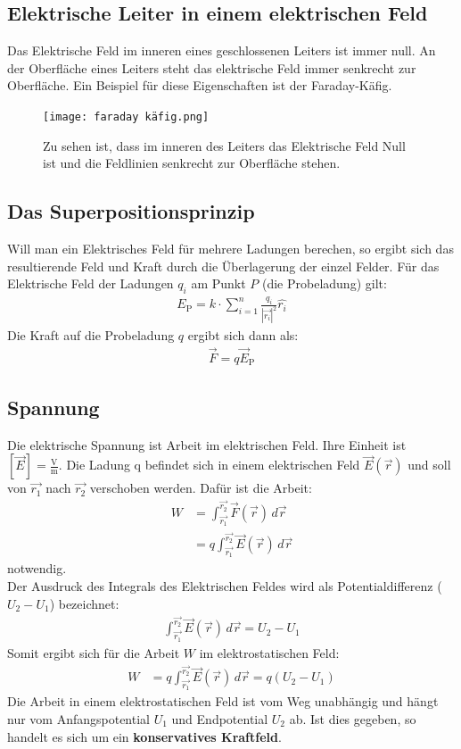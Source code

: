 \documentclass{article}
\begin{document}
\subsection{Elektrische Leiter in einem elektrischen Feld}
Das Elektrische Feld im inneren eines geschlossenen Leiters ist immer null.
An der Oberfläche eines Leiters steht das elektrische Feld immer senkrecht zur Oberfläche.
Ein Beispiel für diese Eigenschaften ist der Faraday-Käfig.
\begin{figure}[H]
    \centering 
    \texttt{[image: faraday käfig.png]}
    \caption{Zu sehen ist, dass im inneren des Leiters das Elektrische Feld Null ist und die Feldlinien senkrecht zur Oberfläche stehen.}
\end{figure}

\subsection{Das Superpositionsprinzip}
Will man ein Elektrisches Feld für mehrere Ladungen berechen, so ergibt sich das resultierende Feld und Kraft 
durch die Überlagerung der einzel Felder.
Für das Elektrische Feld der Ladungen $q_i$ am Punkt $P$ (die Probeladung) gilt:
\begin{align}
    E_\mathrm{P}=k\cdot \sum_{i=1}^n \frac{q_i}{|\vec{r_i}|^2}\hat{r_i}
\end{align}
Die Kraft auf die Probeladung $q$ ergibt sich dann als:
\begin{align}
    \vec{F}=q\vec{E}_\mathrm{P}
\end{align}


\subsection{Spannung}
Die elektrische Spannung ist Arbeit im elektrischen Feld. Ihre Einheit ist $[\vec{E}]=\frac{\mathrm{V}}{\mathrm{m}}$.
Die Ladung q befindet sich in einem elektrischen Feld $\vec{E}(\vec{r})$ und soll von $\vec{r_1}$ nach $\vec{r_2}$ verschoben
werden. Dafür ist die Arbeit:
\begin{align}
    W&=\int_{\vec{r_1}}^{\vec{r_2}}\vec{F}(\vec{r})\,d\vec{r}\\
    &=q\int_{\vec{r_1}}^{\vec{r_2}}\vec{E}(\vec{r})\,d\vec{r}
\end{align}
notwendig.\\

\noindent Der Ausdruck des Integrals des Elektrischen Feldes wird als Potentialdifferenz ($U_2-U_1$) bezeichnet:
\begin{align}
    \int_{\vec{r_1}}^{\vec{r_2}}\vec{E}(\vec{r})\,d\vec{r}=U_2-U_1
\end{align}
Somit ergibt sich für die Arbeit $W$ im elektrostatischen Feld:
\begin{align}
    W&=q\int_{\vec{r_1}}^{\vec{r_2}}\vec{E}(\vec{r})\,d\vec{r}=q(U_2-U_1)
\end{align}
Die Arbeit in einem elektrostatischen Feld ist vom Weg unabhängig und hängt
nur vom Anfangspotential \( U_1 \) und Endpotential \( U_2 \) ab.
Ist dies gegeben, so handelt es sich um ein \textbf{konservatives Kraftfeld}.\\
\end{document}
